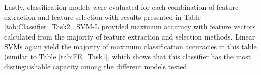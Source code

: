 Lastly, classification models were evaluated for each combination of feature extraction and feature selection with results presented in Table \ref{tab:Classifier_Task2}. SVM-L provided maximum accuracy with feature vectors calculated from the majority of feature extraction and selection methods.  Linear SVMs again yield the majority of maximum classification accuracies in this table (similar to Table \ref{tab:FE_Task1}, which shows that this classifier has the most distinguishable capacity among the different models tested. 


